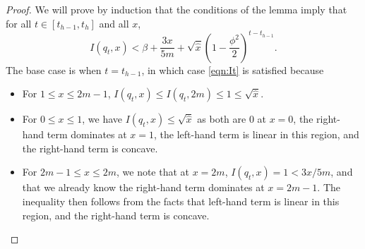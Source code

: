\documentclass[11pt]{article}
\begin{document}
\begin{proof}
We will prove by induction that the conditions of the lemma
  imply that for all $t \in [t_{h-1}, t_{h}]$ and
  all $x$,
\begin{equation}\label{eqn:It}
  I (q_{t}, x)
<
  \beta + \frac{3 x}{5 m}
+
  \sqrt{\widehat{x}} \left(1 - \frac{\phi^{2}}{2} \right)^{t - t_{h-1}}.
\end{equation}
The base case is when $t = t_{h-1}$, in which case
  \eqref{eqn:It} is satisfied because
\begin{itemize}
\item For $1 \leq x \leq 2m-1$,
  $I (q_{t}, x) \leq I (q_{t}, 2m) \leq 1 \leq \sqrt{\widehat{x}}$.
\item For $0 \leq x \leq 1$,
  we have $I (q_{t}, x) \leq \sqrt{\widehat{x}}$ as both are $0$
  at $x = 0$, the right-hand term dominates at $x= 1$, the
  left-hand term is linear in this region, and the right-hand term is concave.

\item For $2m-1 \leq x \leq 2m$,
  we note that at $x=2m$,
  $I (q_{t},x) = 1 < 3x/5m$, and that
  we already know the right-hand term dominates  at $x=2m-1$.
  The inequality then follows from the facts that
  left-hand term is linear in this region, and the right-hand term is concave.
\end{itemize}


\end{proof}
\end{document}
